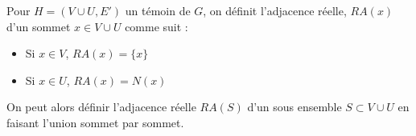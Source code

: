 \documentclass{scrartcl}
\begin{document}
\begin{flushleft}
\begin{def*}
    Pour $H = (V \cup U, E')$ un témoin de $G$, on définit l'adjacence réelle, $RA(x)$ d'un sommet $x \in V \cup U$ comme suit :
    \begin{itemize}
        \item Si $x \in V$, $RA(x) = \{x\}$
        \item Si $x \in U$, $RA(x) = N(x)$
    \end{itemize}
    On peut alors définir l'adjacence réelle $RA(S)$ d'un sous ensemble $S \subset V \cup U$ en faisant l'union sommet par sommet.
\end{def*}

\begin{comment}

\subsection{Contractibilité des arrêtes}

On aimerait donner une condition nécessaire et suffisante permettant de contracter les arrêtes d'un graphe de carte.
Certaines arrêtes sont clairement contractibles, comme celles représentées par $2$ régions partageant une courbe, d'autres ne le sont
pas, comme l'arrête $xy$ du graphe $G_{pch}$ \ref{Gpch}, qui est un graphe de carte.
On dénotera par $\mathcal{G}_{pch}$ l'ensemble des graphes obtenu depuis $G_{pch}$,
en ajoutant des arrêtes entre les sommets distincts de $a, b, c$

\begin{figure}[h]
    \caption{Le graphe $G_{pch}$}\label{Gpch}
    \begin{center}
        \begin{tikzpicture}[auto]
            \begin{scope}[every node/.style={circle, draw}]
                \node (a) {$a$};
                \node (b) [right = 20mm of a] {$b$};
                \node (c) [right = of b] {$c$};
                \node (x) [below left = 12mm and 5mm of a] {$x$};
                \node (y) [below right = 12mm and 5mm of a] {$y$};
                \node (u) [below = of b] {$u$};
                \node (v) [below = of c] {$v$};

                \node (a1) [right = 20mm of v] {$a$};
                \node (b1) [right = of a1] {$b$};
                \node (c1) [right = of b1] {$c$};
                \node (d1) [right = of c1] {$d$};
                \node (x1) [above = of a1] {$x$};
                \node (y1) [above = of b1] {$y$};
                \node (u1) [above = of c1] {$u$};
                \node (v1) [above = of d1] {$v$};
            \end{scope}


\end{comment}
\end{flushleft}
\end{document}
